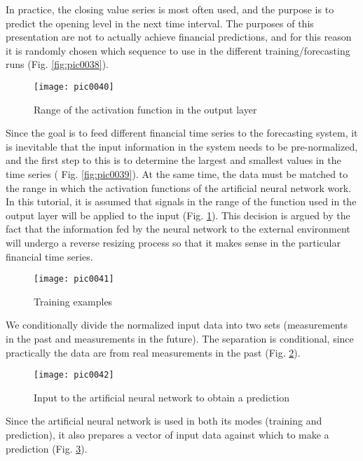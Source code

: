 In practice, the closing value series is most often used, and the purpose is to predict the opening level in the next time interval. The purposes of this presentation are not to actually achieve financial predictions, and for this reason it is randomly chosen which sequence to use in the different training/forecasting runs (Fig. \ref{fig:pic0038}).

\begin{figure}[h]
\centering
\texttt{[image: pic0040]}
\caption{Range of the activation function in the output layer}
\label{fig:pic0040}
\end{figure}
\FloatBarrier

Since the goal is to feed different financial time series to the forecasting system, it is inevitable that the input information in the system needs to be pre-normalized, and the first step to this is to determine the largest and smallest values in the time series ( Fig. \ref{fig:pic0039}). At the same time, the data must be matched to the range in which the activation functions of the artificial neural network work. In this tutorial, it is assumed that signals in the range of the function used in the output layer will be applied to the input (Fig. \ref{fig:pic0040}). This decision is argued by the fact that the information fed by the neural network to the external environment will undergo a reverse resizing process so that it makes sense in the particular financial time series.

\begin{figure}[h]
\centering
\texttt{[image: pic0041]}
\caption{Training examples}
\label{fig:pic0041}
\end{figure}
\FloatBarrier

We conditionally divide the normalized input data into two sets (measurements in the past and measurements in the future). The separation is conditional, since practically the data are from real measurements in the past (Fig. \ref{fig:pic0041}).

\begin{figure}[h]
\centering
\texttt{[image: pic0042]}
\caption{Input to the artificial neural network to obtain a prediction}
\label{fig:pic0042}
\end{figure}
\FloatBarrier

Since the artificial neural network is used in both its modes (training and prediction), it also prepares a vector of input data against which to make a prediction (Fig. \ref{fig:pic0042}).

